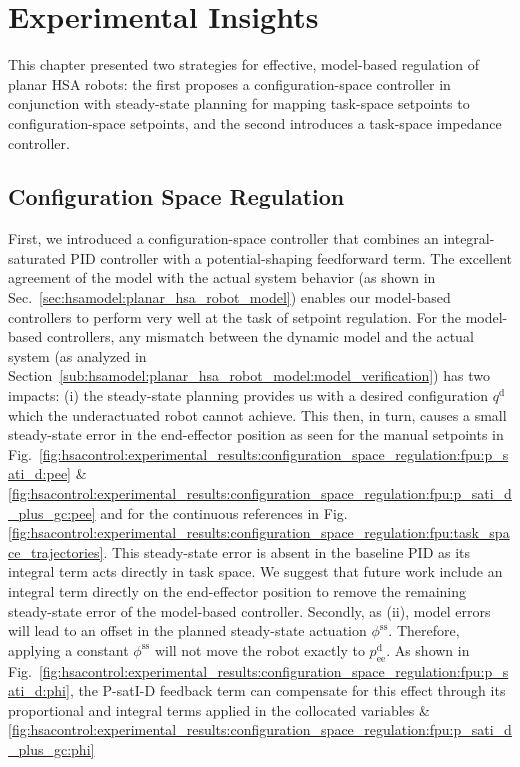 \section{Experimental Insights}
This chapter presented two strategies for effective, model-based regulation of planar \gls{HSA} robots: the first proposes a configuration-space controller in conjunction with steady-state planning for mapping task-space setpoints to configuration-space setpoints, and the second introduces a task-space impedance controller.

\subsection{Configuration Space Regulation}

First, we introduced a configuration-space controller that combines an integral-saturated PID controller with a potential-shaping feedforward term.
The excellent agreement of the model with the actual system behavior (as shown in Sec.~\ref{sec:hsamodel:planar_hsa_robot_model}) enables our model-based controllers to perform very well at the task of setpoint regulation.
For the model-based controllers, any mismatch between the dynamic model and the actual system (as analyzed in Section~\ref{sub:hsamodel:planar_hsa_robot_model:model_verification}) has two impacts: (i) the steady-state planning provides us with a desired configuration $q^\mathrm{d}$ which the underactuated robot cannot achieve. This then, in turn, causes a small steady-state error in the end-effector position as seen for the manual setpoints in Fig.~\ref{fig:hsacontrol:experimental_results:configuration_space_regulation:fpu:p_sati_d:pee} \& \ref{fig:hsacontrol:experimental_results:configuration_space_regulation:fpu:p_sati_d_plus_gc:pee} 
and for the continuous references in Fig.\ref{fig:hsacontrol:experimental_results:configuration_space_regulation:fpu:task_space_trajectories}. This steady-state error is absent in the baseline PID as its integral term acts directly in task space. We suggest that future work include an integral term directly on the end-effector position to remove the remaining steady-state error of the model-based controller. Secondly, as (ii), model errors will lead to an offset in the planned steady-state actuation $\phi^\mathrm{ss}$. Therefore, applying a constant $\phi^\mathrm{ss}$ will not move the robot exactly to $p_\mathrm{ee}^\mathrm{d}$. As shown in Fig.~\ref{fig:hsacontrol:experimental_results:configuration_space_regulation:fpu:p_sati_d:phi}, the P-satI-D feedback term can compensate for this effect through its proportional and integral terms applied in the collocated variables \& \ref{fig:hsacontrol:experimental_results:configuration_space_regulation:fpu:p_sati_d_plus_gc:phi} 
